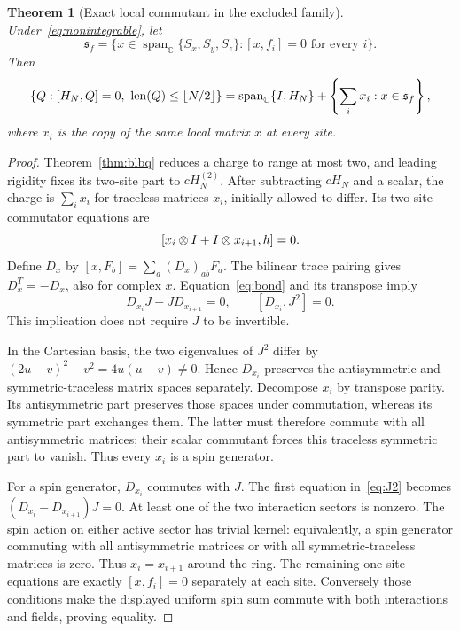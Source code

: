 \documentclass[11pt,a4paper]{article}
\numberwithin{equation}{section}
\newtheorem{theorem}{Theorem}[section]
\theoremstyle{definition}\newtheorem{definition}[theorem]{Definition}
\theoremstyle{remark}\newtheorem{remark}[theorem]{Remark}
\newcommand{\spanC}{\operatorname{span}_{\mathbb C}}
\begin{document}
\begin{theorem}[Exact local commutant in the excluded family]\label{thm:isocommutant}
Under~\eqref{eq:nonintegrable}, let
\[
 \mathfrak s_f=\{x\in\spanC\{S_x,S_y,S_z\}:[x,f_i]=0\text{ for every }i\}.
\]
Then
\begin{equation}\label{eq:isocommutant}
 \{Q:[H_N,Q]=0,\ \len(Q)\le\lfloor N/2\rfloor\}
 =\spanC\{I,H_N\}+\left\{\sum_i x_i:x\in\mathfrak s_f\right\},
\end{equation}
where $x_i$ is the copy of the \emph{same} local matrix $x$ at every site.
\end{theorem}
\begin{proof}
Theorem~\ref{thm:blbq} reduces a charge to range at most two, and leading rigidity fixes its two-site part to $cH_N^{(2)}$. After subtracting $cH_N$ and a scalar, the charge is $\sum_i x_i$ for traceless matrices $x_i$, initially allowed to differ. Its two-site commutator equations are
\begin{equation}\label{eq:bond}
 [x_i\otimes I+I\otimes x_{i+1},h]=0.
\end{equation}
Define $D_x$ by $[x,F_b]=\sum_a(D_x)_{ab}F_a$. The bilinear trace pairing gives $D_x^T=-D_x$, also for complex $x$. Equation~\eqref{eq:bond} and its transpose imply
\begin{equation}\label{eq:J2}
 D_{x_i}J-JD_{x_{i+1}}=0,
 \qquad [D_{x_i},J^2]=0.
\end{equation}
This implication does not require $J$ to be invertible.

In the Cartesian basis, the two eigenvalues of $J^2$ differ by
$(2u-v)^2-v^2=4u(u-v)\ne0$. Hence $D_{x_i}$ preserves the antisymmetric and symmetric-traceless matrix spaces separately. Decompose $x_i$ by transpose parity. Its antisymmetric part preserves those spaces under commutation, whereas its symmetric part exchanges them. The latter must therefore commute with all antisymmetric matrices; their scalar commutant forces this traceless symmetric part to vanish. Thus every $x_i$ is a spin generator.

For a spin generator, $D_{x_i}$ commutes with $J$. The first equation in~\eqref{eq:J2} becomes $(D_{x_i}-D_{x_{i+1}})J=0$. At least one of the two interaction sectors is nonzero. The spin action on either active sector has trivial kernel: equivalently, a spin generator commuting with all antisymmetric matrices or with all symmetric-traceless matrices is zero. Thus $x_i=x_{i+1}$ around the ring. The remaining one-site equations are exactly $[x,f_i]=0$ separately at each site. Conversely those conditions make the displayed uniform spin sum commute with both interactions and fields, proving equality.
\end{proof}
\end{document}
